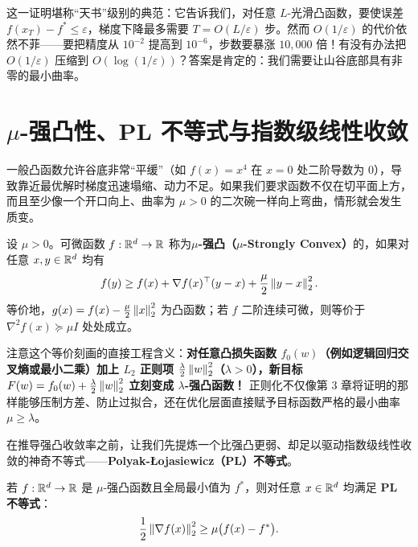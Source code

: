 这一证明堪称“天书”级别的典范：它告诉我们，对任意 $L$-光滑凸函数，要使误差 $f(x_T) - f^* \le \varepsilon$，梯度下降最多需要 $T = O(L/\varepsilon)$ 步。然而 $O(1/\varepsilon)$ 的代价依然不菲——要把精度从 $10^{-2}$ 提高到 $10^{-6}$，步数要暴涨 $10{,}000$ 倍！有没有办法把 $O(1/\varepsilon)$ 压缩到 $O(\log(1/\varepsilon))$？答案是肯定的：我们需要让山谷底部具有非零的最小曲率。

\section{$\mu$-强凸性、PL 不等式与指数级线性收敛}

一般凸函数允许谷底非常“平缓”（如 $f(x) = x^4$ 在 $x=0$ 处二阶导数为 $0$），导致靠近最优解时梯度迅速塌缩、动力不足。如果我们要求函数不仅在切平面上方，而且至少像一个开口向上、曲率为 $\mu > 0$ 的二次碗一样向上弯曲，情形就会发生质变。

\begin{defBox}
\begin{definition}[$\mu$-强凸函数]\label{def:v4-strong-convex}
设 $\mu > 0$。可微函数 $f: \mathbb{R}^d \to \mathbb{R}$ 称为\textbf{$\mu$-强凸（$\mu$-Strongly Convex）}的，如果对任意 $x, y \in \mathbb{R}^d$ 均有
\begin{equation}\label{eq:v4-sc-def}
  f(y) \ge f(x) + \nabla f(x)^\top (y - x) + \frac{\mu}{2}\left\|y - x\right\|_2^2.
\end{equation}
等价地，$g(x) = f(x) - \frac{\mu}{2}\left\|x\right\|_2^2$ 为凸函数；若 $f$ 二阶连续可微，则等价于 $\nabla^2 f(x) \succeq \mu I$ 处处成立。
\end{definition}
\end{defBox}

注意这个等价刻画的直接工程含义：\textbf{对任意凸损失函数 $f_0(w)$（例如逻辑回归交叉熵或最小二乘）加上 $L_2$ 正则项 $\frac{\lambda}{2}\left\|w\right\|_2^2$（$\lambda > 0$），新目标 $F(w) = f_0(w) + \frac{\lambda}{2}\left\|w\right\|_2^2$ 立刻变成 $\lambda$-强凸函数！} 正则化不仅像第 3 章将证明的那样能够压制方差、防止过拟合，还在优化层面直接赋予目标函数严格的最小曲率 $\mu \ge \lambda$。

在推导强凸收敛率之前，让我们先提炼一个比强凸更弱、却足以驱动指数级线性收敛的神奇不等式——\textbf{Polyak-\L{}ojasiewicz（PL）不等式}。

\begin{thmBox}
\begin{lemma}\label{lem:v4-sc-pl}
若 $f: \mathbb{R}^d \to \mathbb{R}$ 是 $\mu$-强凸函数且全局最小值为 $f^*$，则对任意 $x \in \mathbb{R}^d$ 均满足 \textbf{PL 不等式}：
\begin{equation}\label{eq:v4-pl}
  \frac{1}{2}\left\|\nabla f(x)\right\|_2^2 \ge \mu\big(f(x) - f^*\big).
\end{equation}
\end{lemma}
\end{thmBox}

